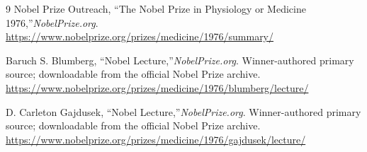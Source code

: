 \begin{thebibliography}{9}
Nobel Prize Outreach, ``The Nobel Prize in Physiology or Medicine 1976,''\emph{NobelPrize.org}.\\
\url{https://www.nobelprize.org/prizes/medicine/1976/summary/}

Baruch S. Blumberg, ``Nobel Lecture,''\emph{NobelPrize.org}. Winner-authored primary source; downloadable from the official Nobel Prize archive.\\
\url{https://www.nobelprize.org/prizes/medicine/1976/blumberg/lecture/}

D. Carleton Gajdusek, ``Nobel Lecture,''\emph{NobelPrize.org}. Winner-authored primary source; downloadable from the official Nobel Prize archive.\\
\url{https://www.nobelprize.org/prizes/medicine/1976/gajdusek/lecture/}
\end{thebibliography}
